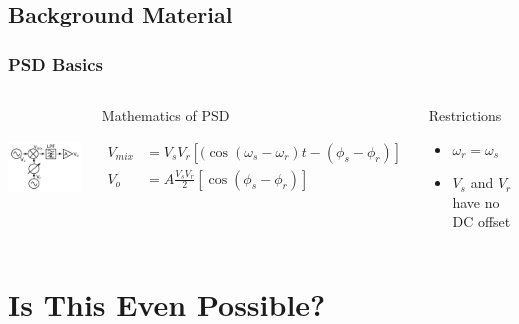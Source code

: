 \documentclass{beamer}
\begin{document}
\subsection{Background Material}
\begin{frame}
\frametitle{PSD Basics}


\begin{columns}[t]
	\column[c]{4.5cm}
	    \includegraphics[height=3.2cm]{PSD_block}
	\column[c]{6.6cm}
\small	
	\begin{exampleblock}{Mathematics of PSD}
	
	\begin{align*}
	V_{mix}&=V_s V_r \left [ ( \cos\left(\omega_s-\omega_r\right)t-(\phi_s-\phi_r)\right]\\
	V_o&=A \frac{V_s V_r}{2} \left[ \cos(\phi_s-\phi_r)\right]
	\end{align*}
	
	\end{exampleblock}

\begin{exampleblock}{Restrictions}
\begin{itemize}
\item $\omega_r=\omega_s$
\item\alert{ $V_s$ and $V_r$ have no DC offset}
\end{itemize}
\end{exampleblock}

\end{columns}
\end{frame}

\section{Is This Even Possible?}
\end{document}
